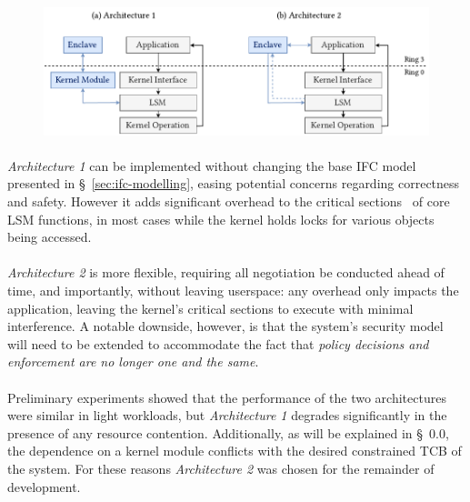 \begin{figure}[]
    \centering
    \includegraphics[width=0.98\linewidth]{figures/SGX-EnclaveIntegration-Design}
    \caption{}
    \vspace{2mm}
    \label{fig:sgx-integration}
    \vspace{5mm}
\end{figure}

\paragraph{}\textit{Architecture 1} can be implemented without changing the base IFC model presented in §~\ref{sec:ifc-modelling}, easing potential concerns regarding correctness and safety. However it adds significant overhead to the critical sections~\cite{Dubois1988SynchronizationCA} of core LSM functions, in most cases while the kernel holds locks for various objects being accessed.

\paragraph{} \textit{Architecture 2} is more flexible, requiring all negotiation be conducted ahead of time, and importantly, without leaving userspace: any overhead only impacts the application, leaving the kernel's critical sections to execute with minimal interference. A notable downside, however, is that the system's security model will need to be extended to accommodate the fact that \textit{policy decisions and enforcement are no longer one and the same}.

\paragraph{} Preliminary experiments showed that the performance of the two architectures were similar in light workloads, but \textit{Architecture 1} degrades significantly in the presence of any resource contention. Additionally, as will be explained in §~0.0, the dependence on a kernel module conflicts with the desired constrained TCB of the system. For these reasons \textit{Architecture 2} was chosen for the remainder of development.

